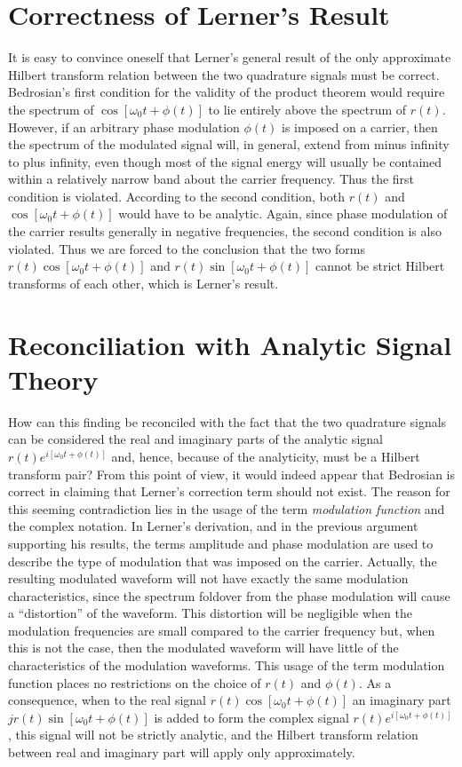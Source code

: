 \documentclass[11pt]{article}
\begin{document}
\section{Correctness of Lerner's Result}
\label{sec:lerner_correctness}

It is easy to convince oneself that Lerner's general result of the only approximate Hilbert transform relation between the two quadrature signals must be correct. Bedrosian's first condition for the validity of the product theorem would require the spectrum of $\cos[\omega_0 t + \phi(t)]$ to lie entirely above the spectrum of $r(t)$. However, if an arbitrary phase modulation $\phi(t)$ is imposed on a carrier, then the spectrum of the modulated signal will, in general, extend from minus infinity to plus infinity, even though most of the signal energy will usually be contained within a relatively narrow band about the carrier frequency. Thus the first condition is violated. According to the second condition, both $r(t)$ and $\cos[\omega_0 t + \phi(t)]$ would have to be analytic. Again, since phase modulation of the carrier results generally in negative frequencies, the second condition is also violated. Thus we are forced to the conclusion that the two forms $r(t) \cos[\omega_0 t + \phi(t)]$ and $r(t) \sin[\omega_0 t + \phi(t)]$ cannot be strict Hilbert transforms of each other, which is Lerner's result.

\section{Reconciliation with Analytic Signal Theory}
\label{sec:reconciliation}

How can this finding be reconciled with the fact that the two quadrature signals can be considered the real and imaginary parts of the analytic signal $r(t)e^{i[\omega_0 t + \phi(t)]}$ and, hence, because of the analyticity, must be a Hilbert transform pair? From this point of view, it would indeed appear that Bedrosian is correct in claiming that Lerner's correction term should not exist. The reason for this seeming contradiction lies in the usage of the term \emph{modulation function} and the complex notation. In Lerner's derivation, and in the previous argument supporting his results, the terms amplitude and phase modulation are used to describe the type of modulation that was imposed on the carrier. Actually, the resulting modulated waveform will not have exactly the same modulation characteristics, since the spectrum foldover from the phase modulation will cause a ``distortion'' of the waveform. This distortion will be negligible when the modulation frequencies are small compared to the carrier frequency but, when this is not the case, then the modulated waveform will have little of the characteristics of the modulation waveforms. This usage of the term modulation function places no restrictions on the choice of $r(t)$ and $\phi(t)$. As a consequence, when to the real signal $r(t) \cos[\omega_0 t + \phi(t)]$ an imaginary part $jr(t) \sin[\omega_0 t + \phi(t)]$ is added to form the complex signal $r(t)e^{i[\omega_0 t + \phi(t)]}$, this signal will not be strictly analytic, and the Hilbert transform relation between real and imaginary part will apply only approximately.
\end{document}
